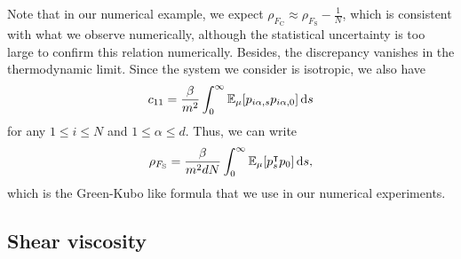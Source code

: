 Note that in our numerical example, we expect $\rho_{F_{\mathrm{C}}}\approx \rho_{F_{\mathrm{S}}}-\frac{1}{N}$, which is consistent with what we observe numerically, although the statistical uncertainty is too large to confirm this relation numerically.
Besides, the discrepancy vanishes in the thermodynamic limit.
Since the system we consider is isotropic, we also have 
\[c_{11}=\frac{\beta}{m^2}\int_0^\infty\mathbb{E}_\mu[p_{i\alpha,s}p_{i\alpha,0}]\,\mathrm{d} s\]
for any $1\leq i\leq N$ and $1\leq \alpha\leq d$. Thus, we can write 
\begin{equation}
    \label{eq:diffusion_gk_scalar_product}
    \rho_{F_{\mathrm{S}}}=\frac{\beta}{m^2 d N}\int_{0}^\infty \mathbb{E}_\mu[p_s^\intercal p_0]\,\mathrm{d} s,
\end{equation}
which is the Green-Kubo like formula that we use in our numerical experiments.
\subsection{Shear viscosity}    